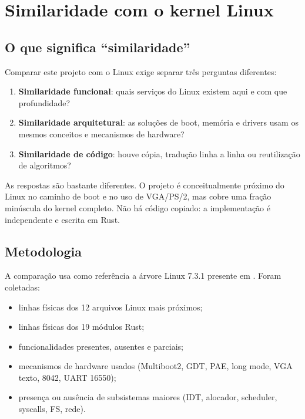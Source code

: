 \chapter{Similaridade com o kernel Linux}
\label{cap:similaridade}

\section{O que significa ``similaridade''}

Comparar este projeto com o Linux exige separar tr\^es perguntas diferentes:

\begin{enumerate}
  \item \textbf{Similaridade funcional}: quais servi\c{c}os do Linux existem
        aqui e com que profundidade?
  \item \textbf{Similaridade arquitetural}: as solu\c{c}\~oes de boot,
        mem\'oria e drivers usam os mesmos conceitos e mecanismos de
        hardware?
  \item \textbf{Similaridade de c\'odigo}: houve c\'opia, tradu\c{c}\~ao
        linha a linha ou reutiliza\c{c}\~ao de algoritmos?
\end{enumerate}

As respostas s\~ao bastante diferentes. O projeto \'e conceitualmente
pr\'oximo do Linux no caminho de boot e no uso de VGA/PS/2, mas cobre uma
fra\c{c}\~ao min\'uscula do kernel completo. N\~ao h\'a c\'odigo copiado: a
implementa\c{c}\~ao \'e independente e escrita em Rust.

\section{Metodologia}

A compara\c{c}\~ao usa como refer\^encia a \'arvore Linux 7.3.1 presente em
. Foram coletadas:

\begin{itemize}
  \item linhas f\'isicas dos 12 arquivos Linux mais pr\'oximos;
  \item linhas f\'isicas dos 19 m\'odulos Rust;
  \item funcionalidades presentes, ausentes e parciais;
  \item mecanismos de hardware usados (Multiboot2, GDT, PAE, long mode,
        VGA texto, 8042, UART 16550);
  \item presen\c{c}a ou aus\^encia de subsistemas maiores (IDT, alocador,
        scheduler, syscalls, FS, rede).
\end{itemize}

